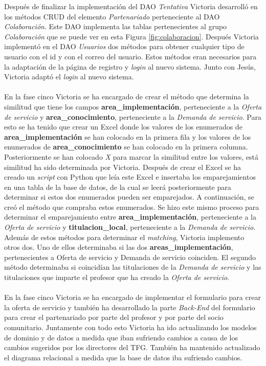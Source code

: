 \documentclass[11pt]{book}
\begin{document}
	Después de finalizar la implementación del DAO \textit{Tentativa} Victoria desarrolló en los métodos CRUD del elemento \textit{Partenariado} perteneciente al DAO \textit{Colaboración}. Este DAO implementa las tablas pertenecientes al grupo \textit{Colaboración} que se puede ver en esta Figura \ref{fig:colaboracion}.
	Después Victoria implementó en el DAO \textit{Usuarios} dos métodos para obtener cualquier tipo de usuario con el id y con el correo del usuario. Estos métodos eran necesarios para la adaptación de la página de registro y \textit{login} al nuevo sistema. Junto con Jesús, Victoria adaptó el \textit{login} al nuevo sistema.\\\\
	En la fase cinco Victoria se ha encargado de crear el método que determina la similitud que tiene los campos \textbf{area\_implementación}, perteneciente a la \textit{Oferta de servicio} y \textbf{area\_conocimiento}, perteneciente a la \textit{Demanda de servicio}. Para esto se ha tenido que crear un Excel donde los valores de los enumerados de \textbf{area\_implementación} se han colocado en la primera fila y los valores de los enumerados de \textbf{area\_conocimiento} se han colocado en la primera columna. Posteriormente se han colocado \textit{X} para marcar la similitud entre los valores, está similitud ha sido determinada por Victoria. Después de crear el Excel se ha creado un \textit{script} con Python que leía este Excel e insertaba los emparejamientos en una tabla de la base de datos, de la cual se leerá posteriormente para determinar si estos dos enumerados pueden ser emparejados. A continuación, se creó el método que compraba estos enumerados. Se hizo este mismo proceso para determinar el emparejamiento entre \textbf{area\_implementación}, perteneciente a la \textit{Oferta de servicio} y \textbf{titulacion\_local}, perteneciente a la \textit{Demanda de servicio}.\\
	Además de estos métodos para determinar el \textit{matching}, Victoria implemento otros dos. Uno de ellos determinaba si las dos \textbf{areas\_implementación}, pertenecientes a Oferta de servicio y Demanda de servicio coinciden. El segundo método determinaba si coincidían las titulaciones de la \textit{Demanda de servicio} y las titulaciones que imparte el profesor que ha creado la \textit{Oferta de servicio}.\\\\
	En la fase cinco Victoria se ha encargado de implementar el formulario para crear la oferta de servicio y también ha desarrollado la parte \textit{ Back-End } del formulario para crear el partenariado por parte del profesor y por parte del socio comunitario.
	Juntamente con todo esto Victoria ha ido actualizando los modelos de dominio y de datos a medida que iban sufriendo cambios a causa de los cambios sugeridos por los directores del TFG. También ha mantenido actualizado el diagrama relacional a medida que la base de datos iba sufriendo cambios.
\end{document}
